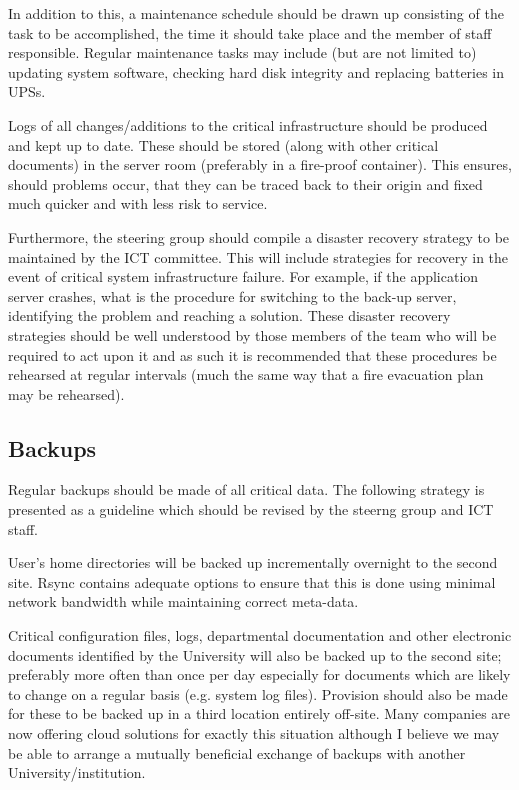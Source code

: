 \documentclass[a4paper, twoside]{article}
\begin{document}
In addition to this, a maintenance schedule should be drawn up consisting of the
task to be accomplished, the time it should take place and the member of staff
responsible. Regular maintenance tasks may include (but are not limited to)
updating system software, checking hard disk integrity and replacing batteries
in UPSs.

Logs of all changes/additions to the critical infrastructure should be produced
and kept up to date. These should be stored (along with other critical
documents) in the server room (preferably in a fire-proof container). This
ensures, should problems occur, that they can be traced back to their origin and
fixed much quicker and with less risk to service.

Furthermore, the steering group should compile a disaster recovery strategy to
be maintained by the ICT committee. This will include strategies for recovery in
the event of critical system infrastructure failure. For example, if the
application server crashes, what is the procedure for switching to the back-up
server, identifying the problem and reaching a solution. These disaster recovery
strategies should be well understood by those members of the team who will be
required to act upon it and as such it is recommended that these procedures be
rehearsed at regular intervals (much the same way that a fire evacuation plan
may be rehearsed).

\subsection{Backups}
Regular backups should be made of all critical data. The following strategy is
presented as a guideline which should be revised by the steerng group and ICT
staff.

User's home directories will be backed up incrementally overnight to the second
site. Rsync contains adequate options to ensure that this is done using minimal
network bandwidth while maintaining correct meta-data.

Critical configuration files, logs, departmental documentation and other
electronic documents identified by the University will also be backed up to the
second site; preferably more often than once per day especially for documents
which are likely to change on a regular basis (e.g. system log files). Provision
should also be made for these to be backed up in a third location entirely
off-site. Many companies are now offering cloud solutions for exactly this
situation although I believe we may be able to arrange a mutually beneficial
exchange of backups with another University/institution.
\end{document}
